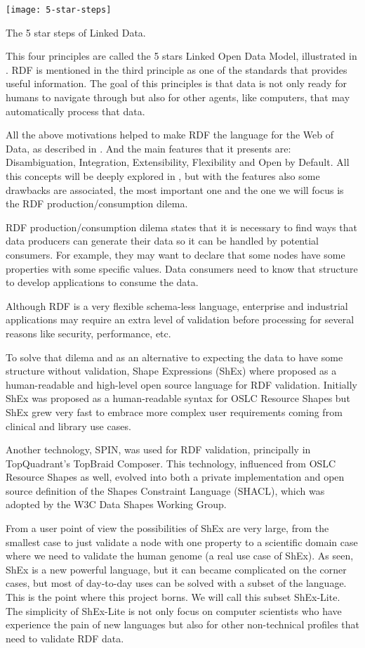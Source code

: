 \begin{marginfigure}
	\texttt{[image: 5-star-steps]}
	\caption[The 5 star steps of Linked Data]{The 5 star steps of Linked Data.}
\end{marginfigure}

This four principles are called the 5 stars Linked Open Data Model, illustrated in .
RDF is mentioned in the third principle as one of the standards that provides useful information. The goal of this principles is that data is not only ready for humans to navigate through but also for other agents, like computers, that may automatically process that data.

All the above motivations helped to make RDF the language for the Web of Data, as described in . And the main features that it presents are: Disambiguation, Integration, Extensibility, Flexibility and Open by Default. All this concepts will be deeply explored in , but with the features also some drawbacks are associated, the most important one and the one we will focus is the RDF production/consumption dilema.

RDF production/consumption dilema states that it is necessary to find ways that data producers can generate their data so it can be handled by potential consumers. For example, they may want to declare that some nodes have some properties with some specific values. Data consumers need to know that structure to develop applications to consume the data.

Although RDF is a very flexible schema-less language, enterprise and industrial applications may require an extra level of validation before processing for several reasons like security, performance, etc.

To solve that dilema and as an alternative to expecting the data to have some structure without validation, Shape Expressions (ShEx) where proposed as a human-readable and high-level open source language for RDF validation. Initially ShEx was proposed as a human-readable syntax for OSLC Resource Shapes  but ShEx grew very fast to embrace more complex user requirements coming from clinical and library use cases.

Another technology, SPIN, was used for RDF validation, principally in TopQuadrant’s TopBraid Composer. This technology, influenced from OSLC Resource Shapes as well, evolved into both a private implementation and open source definition of the Shapes Constraint Language (SHACL), which was adopted by the W3C Data Shapes Working Group.

From a user point of view the possibilities of ShEx are very large, from the smallest case to just validate a node with one property to a scientific domain case where we need to validate the human genome (a real use case of ShEx). As seen, ShEx is a new powerful language, but it can became complicated on the corner cases, but most of day-to-day uses can be solved with a subset of the language. This is the point where this project borns. We will call this subset ShEx-Lite. The simplicity of ShEx-Lite is not only focus on computer scientists who have experience the pain of new languages but also for other non-technical profiles that need to validate RDF data.
